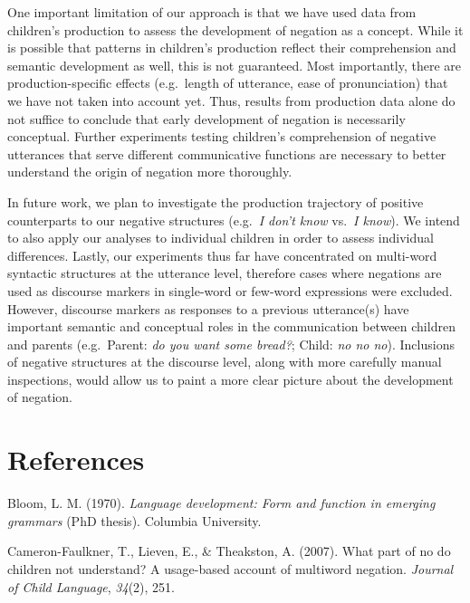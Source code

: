 \documentclass[10pt, letterpaper]{article}
\begin{document}
One important limitation of our approach is that we have used data from
children's production to assess the development of negation as a
concept. While it is possible that patterns in children's production
reflect their comprehension and semantic development as well, this is
not guaranteed. Most importantly, there are production-specific effects
(e.g.~length of utterance, ease of pronunciation) that we have not taken
into account yet. Thus, results from production data alone do not
suffice to conclude that early development of negation is necessarily
conceptual. Further experiments testing children's comprehension of
negative utterances that serve different communicative functions are
necessary to better understand the origin of negation more thoroughly.

In future work, we plan to investigate the production trajectory of
positive counterparts to our negative structures (e.g.~\emph{I don't
know} vs.~\emph{I know}). We intend to also apply our analyses to
individual children in order to assess individual differences. Lastly,
our experiments thus far have concentrated on multi-word syntactic
structures at the utterance level, therefore cases where negations are
used as discourse markers in single-word or few-word expressions were
excluded. However, discourse markers as responses to a previous
utterance(s) have important semantic and conceptual roles in the
communication between children and parents (e.g.~Parent: \emph{do you
want some bread?}; Child: \emph{no no no}). Inclusions of negative
structures at the discourse level, along with more carefully manual
inspections, would allow us to paint a more clear picture about the
development of negation.

\hypertarget{references}{%
\section{References}\label{references}}

\setlength{\parindent}{-0.1in} 
\setlength{\leftskip}{0.125in}

\noindent

\hypertarget{refs}{}
\leavevmode\hypertarget{ref-bloom1970language}{}%
Bloom, L. M. (1970). \emph{Language development: Form and function in
emerging grammars} (PhD thesis). Columbia University.

\leavevmode\hypertarget{ref-cameron2007part}{}%
Cameron-Faulkner, T., Lieven, E., \& Theakston, A. (2007). What part of
no do children not understand? A usage-based account of multiword
negation. \emph{Journal of Child Language}, \emph{34}(2), 251.
\end{document}
